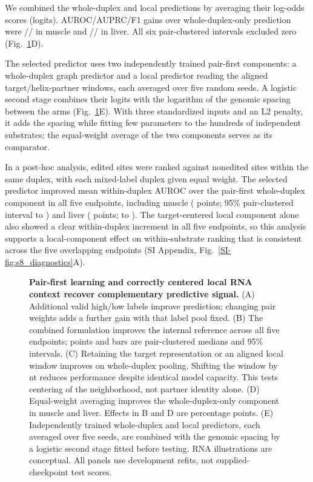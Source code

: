 \documentclass[9pt,twocolumn,twoside]{pnas-new}
\newcommand{\SIref}[1]{\ref*{SI-#1}}
\begin{document}
We combined the whole-duplex and local predictions by averaging their log-odds scores (logits). AUROC/AUPRC/F1 gains over whole-duplex-only prediction were \MuscleEnsembleDeltaAUROCMedian{}/\MuscleEnsembleDeltaAUPRCMedian{}/\MuscleEnsembleDeltaFOneMedian{} in muscle and \LiverEnsembleDeltaAUROCMedian{}/\LiverEnsembleDeltaAUPRCMedian{}/\LiverEnsembleDeltaFOneMedian{} in liver. All six pair-clustered intervals excluded zero (Fig.~\ref{fig:principles}D).

The selected predictor uses two independently trained pair-first components: a whole-duplex graph predictor and a local predictor reading the aligned target/helix-partner windows, each averaged over five random seeds. A logistic second stage combines their logits with the logarithm of the genomic spacing between the arms (Fig.~\ref{fig:principles}E). With three standardized inputs and an L2 penalty, it adds the spacing while fitting few parameters to the hundreds of independent substrates; the equal-weight average of the two components serves as its comparator.

In a post-hoc analysis, edited sites were ranked against nonedited sites within the same duplex, with each mixed-label duplex given equal weight. The selected predictor improved mean within-duplex AUROC over the pair-first whole-duplex component in all five endpoints, including muscle (\MuscleWithinEnsembleMean{} points; 95\% pair-clustered interval \MuscleWithinEnsembleLower{} to \MuscleWithinEnsembleUpper{}) and liver (\LiverWithinEnsembleMean{} points; \LiverWithinEnsembleLower{} to \LiverWithinEnsembleUpper{}). The target-centered local component alone also showed a clear within-duplex increment in all five endpoints, so this analysis supports a local-component effect on within-substrate ranking that is consistent across the five overlapping endpoints (SI Appendix, Fig.~\SIref{fig:s8_diagnostics}A).

\begin{figure}[t!]
\centering

\caption{\textbf{Pair-first learning and correctly centered local RNA context recover complementary predictive signal.} (A) Additional valid high/low labels improve prediction; changing pair weights adds a further gain with that label pool fixed. (B) The combined formulation improves the internal reference across all five endpoints; points and bars are pair-clustered medians and 95\% intervals. (C) Retaining the target representation or an aligned local window improves on whole-duplex pooling. Shifting the window by \LocalControlShift{} nt reduces performance despite identical model capacity. This tests centering of the neighborhood, not partner identity alone. (D) Equal-weight averaging improves the whole-duplex-only component in muscle and liver. Effects in B and D are percentage points. (E) Independently trained whole-duplex and local predictors, each averaged over five seeds, are combined with the genomic spacing by a logistic second stage fitted before testing. RNA illustrations are conceptual. All panels use development refits, not supplied-checkpoint test scores.}
\label{fig:principles}
\end{figure}
\end{document}
